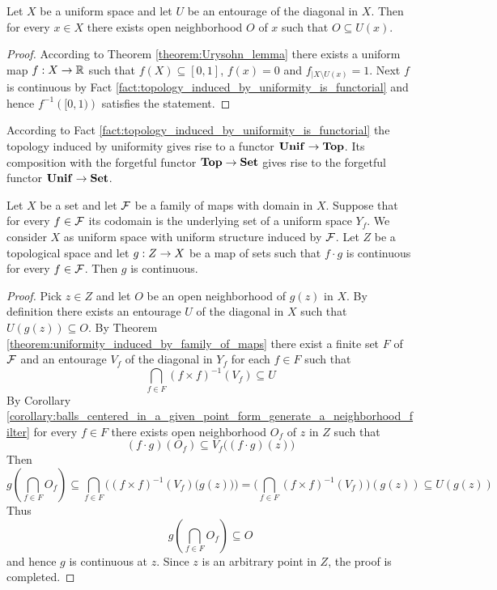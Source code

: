 \documentclass[10pt]{amsart}
\begin{document}
\begin{corollary}\label{corollary:balls_centered_in_a_given_point_form_generate_a_neighborhood_filter}
	Let $X$ be a uniform space and let $U$ be an entourage of the diagonal in $X$. Then for every $x \in X$ there exists open neighborhood $O$ of $x$ such that $O \subseteq U(x)$.
\end{corollary}
\begin{proof}
	According to Theorem \ref{theorem:Urysohn_lemma} there exists a uniform map $f:X\rightarrow {\mathbb R}$ such that $f(X) \subseteq [0,1]$, $f(x) = 0$ and $f_{\mid X\setminus U(x)} = 1$. Next $f$ is continuous by Fact \ref{fact:topology_induced_by_uniformity_is_functorial} and hence $f^{-1}\left([0,1)\right)$ satisfies the statement.
\end{proof}
\noindent
According to Fact \ref{fact:topology_induced_by_uniformity_is_functorial} the topology induced by uniformity gives rise to a functor $\mathbf{Unif} \rightarrow \mathbf{Top}$. Its composition with the forgetful functor $\mathbf{Top} \rightarrow \mathbf{Set}$ gives rise to the forgetful functor $\mathbf{Unif} \rightarrow \mathbf{Set}$.

\begin{theorem}\label{theorem:uniformity_induced_by_family_of_maps_induces_topology_induced_by_family}
	Let $X$ be a set and let ${\mathcal F}$ be a family of maps with domain in $X$. Suppose that for every $f\in {\mathcal F}$ its codomain is the underlying  set of a uniform space $Y_f$. We consider $X$ as uniform space with uniform structure induced by ${\mathcal F}$. Let $Z$ be a topological space and let $g:Z\rightarrow X$ be a map of sets such that $f \cdot g$ is continuous for every $f \in {\mathcal F}$. Then $g$ is continuous.
\end{theorem}
\begin{proof}
	Pick $z \in Z$ and let $O$ be an open neighborhood of $g(z)$ in $X$. By definition there exists an entourage $U$ of the diagonal in $X$ such that $U\left(g(z)\right) \subseteq O$. By Theorem \ref{theorem:uniformity_induced_by_family_of_maps} there exist a finite set $F$ of ${\mathcal F}$ and an entourage $V_f$ of the diagonal in $Y_f$ for each $f\in F$ such that
	$$\bigcap_{f\in F}\left(f\times f\right)^{-1}(V_f) \subseteq U$$
	By Corollary \ref{corollary:balls_centered_in_a_given_point_form_generate_a_neighborhood_filter} for every $f \in F$ there exists open neighborhood $O_f$ of $z$ in $Z$ such that
	$$\left(f\cdot g\right)\left(O_f\right) \subseteq V_f\bigg(\left(f\cdot g\right)(z)\bigg)$$
	Then
	$$g\left(\bigcap_{f\in F}O_f\right) \subseteq \bigcap_{f\in F}\bigg(\left(f\times f\right)^{-1}(V_f)\big(g(z)\big)\bigg) = \bigg(\bigcap_{f\in F}\left(f\times f\right)^{-1}(V_f)\bigg)\left(g(z)\right) \subseteq U\left(g(z)\right)$$
	Thus
	$$g\left(\bigcap_{f\in F}O_f\right) \subseteq O$$
	and hence $g$ is continuous at $z$. Since $z$ is an arbitrary point in $Z$, the proof is completed.
\end{proof}
\end{document}
